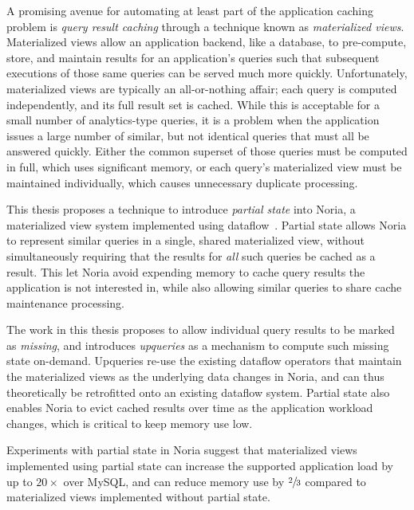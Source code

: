 A promising avenue for automating at least part of the application caching
problem is \emph{query result caching} through a technique known as
\emph{materialized views}. Materialized views allow an application backend, like
a database, to pre-compute, store, and maintain results for an application's
queries such that subsequent executions of those same queries can be served much
more quickly. Unfortunately, materialized views are typically an all-or-nothing
affair; each query is computed independently, and its full result set is cached.
While this is acceptable for a small number of analytics-type queries, it is a
problem when the application issues a large number of similar, but not identical
queries that must all be answered quickly. Either the common superset of those
queries must be computed in full, which uses significant memory, or each query's
materialized view must be maintained individually, which causes unnecessary
duplicate processing.

This thesis proposes a technique to introduce \textit{partial state} into Noria,
a materialized view system implemented using dataflow~\cite{noria}. Partial
state allows Noria to represent similar queries in a single, shared materialized
view, without simultaneously requiring that the results for \emph{all} such
queries be cached as a result. This let Noria avoid expending memory to cache
query results the application is not interested in, while also allowing similar
queries to share cache maintenance processing.

The work in this thesis proposes to allow individual query results to be marked
as \textit{missing}, and introduces \textit{upqueries} as a mechanism to compute
such missing state on-demand. Upqueries re-use the existing dataflow operators
that maintain the materialized views as the underlying data changes in Noria,
and can thus theoretically be retrofitted onto an existing dataflow system.
Partial state also enables Noria to evict cached results over time as the
application workload changes, which is critical to keep memory use low.

Experiments with partial state in Noria suggest that materialized views
implemented using partial state can increase the supported application load by
up to $20\times$ over MySQL, and can reduce memory use by $\sfrac{2}{3}$
compared to materialized views implemented without partial state.


